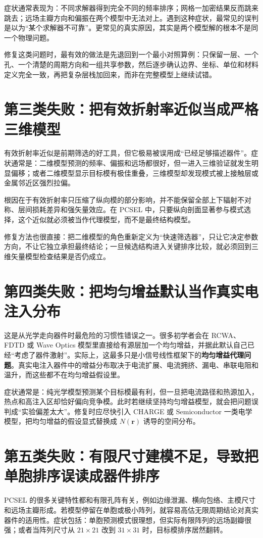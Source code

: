 症状通常表现为：不同求解器得到完全不同的频率排序；网格一加密结果反而跳来跳去；远场主瓣方向和偏振在两个模型中无法对上。遇到这种症状，最常见的误判是以为“某个求解器不可靠”。更常见的真实原因，其实是两个模型解的根本不是同一个物理问题。

修复这类问题时，最有效的做法是先退回到一个最小对照算例：只保留一层、一个孔、一个清楚的周期方向和一组共享参数，然后逐步确认边界、坐标、单位和材料定义完全一致，再把复杂层栈加回来，而非在完整模型上继续试错。

\section{第三类失败：把有效折射率近似当成严格三维模型}
有效折射率近似是前期筛选的好工具，但它极易被误用成“已经足够描述器件”。症状通常是：二维模型预测的频率、偏振和远场都很好，但一进入三维验证就发生明显偏移；或者二维模型显示目标模有极佳重叠，三维模型却发现模式被上接触层或金属邻近区强烈拉偏。

根因在于有效折射率只压缩了纵向模的部分影响，并不能保留全部上下辐射不对称、层间损耗差异和强矢量效应。在 PCSEL 中，只要纵向剖面显著参与模式选择，这个近似就必须被当作代理模型，而不是最终结构模型。

修复方法也很直接：把二维模型的角色重新定义为“快速筛选器”，只让它决定参数方向，不让它独立承担最终结论；一旦候选结构进入关键排序比较，就必须回到三维矢量模型检查结果是否仍成立。

\section{第四类失败：把均匀增益默认当作真实电注入分布}
这是从光学走向器件时最危险的习惯性错误之一。很多初学者会在 RCWA、FDTD 或 Wave Optics 模型里直接给有源层加一个均匀增益，并据此默认自己已经“考虑了器件激射”。实际上，这最多只是小信号线性框架下的\textbf{均匀增益代理问题}。真实电注入器件中的增益分布取决于电流扩展、电流拥挤、漏电、串联电阻和温升，而这些都不在均匀增益假设里。

症状通常是：纯光学模型预测某个目标模最有利，但一旦把电流路径和热源加入，热点和高注入区却恰好偏向竞争模。此时若继续坚持均匀增益模型，就会把问题误判成“实验偏差太大”。修复时应尽快引入 CHARGE 或 Semiconductor 一类电学模型，把均匀增益的假设显式替换成 $N(\mathbf{r})$ 诱导的空间分布。

\section{第五类失败：有限尺寸建模不足，导致把单胞排序误读成器件排序}
PCSEL 的很多关键特性都和有限孔阵有关，例如边缘泄漏、横向包络、主模尺寸和远场主瓣形成。若模型停留在单胞或极小阵列，就容易高估无限周期结论对真实器件的适用性。症状包括：单胞预测模式很理想，但实际有限阵列的远场副瓣很强；或者当阵列尺寸从 $21\times21$ 改到 $31\times31$ 时，目标模排序居然翻转。

